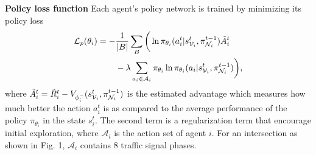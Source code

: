 \textbf{Policy loss function}
Each agent's policy network is trained by minimizing its policy loss
\begin{align}
    \label{eqn:L_p}
    \mathcal{L}_p(\theta_i) = -& \frac{1}{|B|}\sum_{B} \bigg(\ln \pi_{\theta_i}(a_i^t|s^t_{\mathcal{V}_i}, \pi^{t-1}_{\mathcal{N}_i}) \Tilde{A}^t_i \\
    &- \lambda \sum_{a_i \in \mathcal{A}_i} \pi_{\theta_i} \ln \pi_{\theta_i} (a_i | s^t_{\mathcal{V}_i}, \pi^{t-1}_{\mathcal{N}_i}) \bigg),
\end{align}
where $\Tilde{A}^t_i = \Tilde{R}^t_i - V_{\phi_i^-}(s^t_{\mathcal{V}_i}, \pi^{t-1}_{\mathcal{N}_i})$ is the estimated advantage which measures how much better the action $a^t_i$ is as compared to the average performance of the policy $\pi_{\theta_i}$ in the state $s_i^t$. The second term is a regularization term that encourage initial exploration, where $\mathcal{A}_i$ is the action set of agent $i$. For an intersection as shown in Fig. 1, $\mathcal{A}_i$ contains 8 traffic signal phases. 


